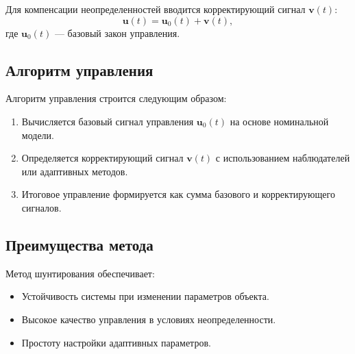 \documentclass[a4paper,14pt]{extarticle} %
\begin{document}
Для компенсации неопределенностей вводится корректирующий сигнал $\mathbf{v}(t)$:
\begin{equation}
\mathbf{u}(t) = \mathbf{u}_0(t) + \mathbf{v}(t),
\end{equation}
где $\mathbf{u}_0(t)$ — базовый закон управления.

\subsection*{Алгоритм управления}
Алгоритм управления строится следующим образом:
\begin{enumerate}
    \item Вычисляется базовый сигнал управления $\mathbf{u}_0(t)$ на основе номинальной модели.
    \item Определяется корректирующий сигнал $\mathbf{v}(t)$ с использованием наблюдателей или адаптивных методов.
    \item Итоговое управление формируется как сумма базового и корректирующего сигналов.
\end{enumerate}

\subsection*{Преимущества метода}
Метод шунтирования обеспечивает:
\begin{itemize}
    \item Устойчивость системы при изменении параметров объекта.
    \item Высокое качество управления в условиях неопределенности.
    \item Простоту настройки адаптивных параметров.
\end{itemize}
\end{document}
